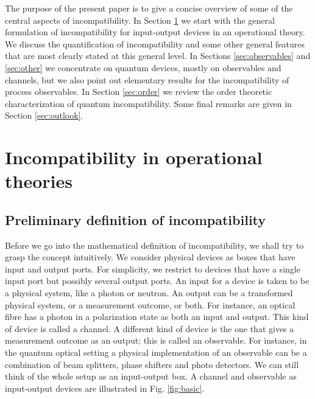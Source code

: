 \documentclass[12pt]{article}
\theoremstyle{definition}
\begin{document}
The purpose of the present paper is to give a concise overview of some of the central aspects of incompatibility. In Section \ref{sec:incompatibility} we start with the general formulation of incompatibility for input-output devices in an operational theory. We discuss the quantification of incompatibility and some other general features that are most clearly stated at this general level. In Sections \ref{sec:observables} and \ref{sec:other} we concentrate on quantum devices, mostly on observables and channels, but we also point out elementary results for the incompatibility of process observables. 
In Section \ref{sec:order} we review the order theoretic characterization of quantum incompatibility.
Some final remarks are given in Section \ref{sec:outlook}.

\section{Incompatibility in operational theories}\label{sec:incompatibility}

\subsection{Preliminary definition of incompatibility}\label{sec:prelim}

Before we go into the mathematical definition of incompatibility, we shall try to grasp the concept intuitively.
We consider physical devices as boxes that have input and output ports.
For simplicity, we restrict to devices that have a single input port but possibly several output ports.  
An input for a device is taken to be a physical system, like a photon or neutron.
An output can be a transformed physical system, or a measurement outcome, or both.
For instance, an optical fibre has a photon in a polarization state as both an input and output.
This kind of device is called a channel.
A different kind of device is the one that gives a measurement outcome as an output; this is called an observable. 
For instance, in the quantum optical setting a physical implementation of an observable can be a combination of beam splitters, phase shifters and photo detectors.
We can still think of the whole setup as an input-output box. 
A channel and observable as input-output devices are illustrated in Fig. \ref{fig:basic}.
\end{document}
